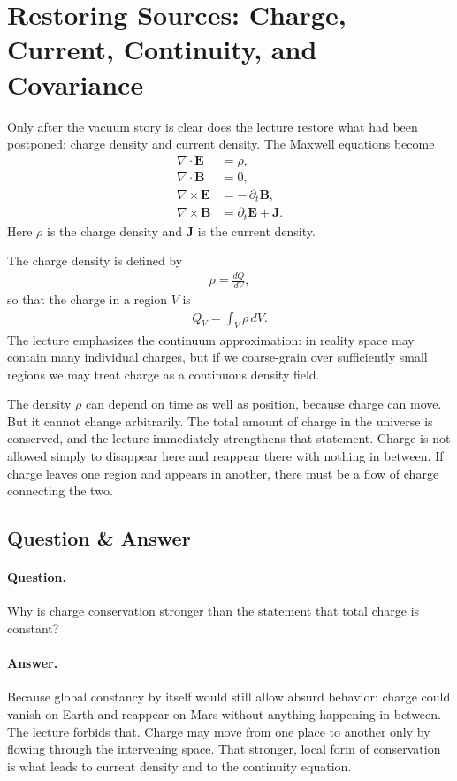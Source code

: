 \section{Restoring Sources: Charge, Current, Continuity, and Covariance}

Only after the vacuum story is clear does the lecture restore what had been postponed: charge density and current density. The Maxwell equations become
\begin{align}
\nabla \cdot \mathbf E &= \rho,\\
\nabla \cdot \mathbf B &= 0,\\
\nabla \times \mathbf E &= -\,\partial_t \mathbf B,\\
\nabla \times \mathbf B &= \partial_t \mathbf E + \mathbf J.
\end{align}
Here \(\rho\) is the charge density and \(\mathbf J\) is the current density.

The charge density is defined by
\begin{align}
\rho = \frac{dQ}{dV},
\end{align}
so that the charge in a region \(V\) is
\begin{align}
Q_V = \int_V \rho\,dV.
\end{align}
The lecture emphasizes the continuum approximation: in reality space may contain many individual charges, but if we coarse-grain over sufficiently small regions we may treat charge as a continuous density field.

The density \(\rho\) can depend on time as well as position, because charge can move. But it cannot change arbitrarily. The total amount of charge in the universe is conserved, and the lecture immediately strengthens that statement. Charge is not allowed simply to disappear here and reappear there with nothing in between. If charge leaves one region and appears in another, there must be a flow of charge connecting the two.

\subsection{Question \& Answer}

\paragraph{Question.} Why is charge conservation stronger than the statement that total charge is constant?

\paragraph{Answer.} Because global constancy by itself would still allow absurd behavior: charge could vanish on Earth and reappear on Mars without anything happening in between. The lecture forbids that. Charge may move from one place to another only by flowing through the intervening space. That stronger, local form of conservation is what leads to current density and to the continuity equation.

